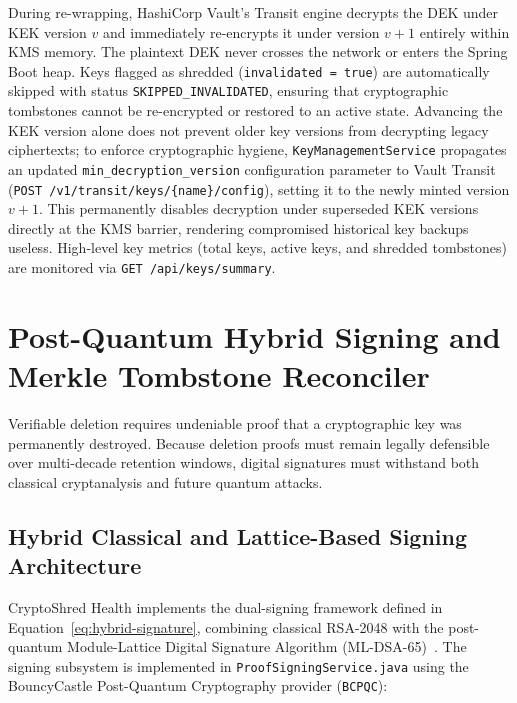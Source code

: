 During re-wrapping, HashiCorp Vault's Transit engine decrypts the DEK under KEK version $v$ and immediately re-encrypts it under version $v+1$ entirely within KMS memory. The plaintext DEK never crosses the network or enters the Spring Boot heap. Keys flagged as shredded (\texttt{invalidated = true}) are automatically skipped with status \texttt{SKIPPED\_INVALIDATED}, ensuring that cryptographic tombstones cannot be re-encrypted or restored to an active state. Advancing the KEK version alone does not prevent older key versions from decrypting legacy ciphertexts; to enforce cryptographic hygiene, \texttt{KeyManagementService} propagates an updated \texttt{min\_decryption\_version} configuration parameter to Vault Transit (\texttt{POST /v1/transit/keys/\{name\}/config}), setting it to the newly minted version $v+1$. This permanently disables decryption under superseded KEK versions directly at the KMS barrier, rendering compromised historical key backups useless. High-level key metrics (total keys, active keys, and shredded tombstones) are monitored via \texttt{GET /api/keys/summary}.


\section{Post-Quantum Hybrid Signing and Merkle Tombstone Reconciler}\label{section:impl-signing}

Verifiable deletion requires undeniable proof that a cryptographic key was permanently destroyed. Because deletion proofs must remain legally defensible over multi-decade retention windows, digital signatures must withstand both classical cryptanalysis and future quantum attacks.

\subsection{Hybrid Classical and Lattice-Based Signing Architecture}

CryptoShred Health implements the dual-signing framework defined in Equation~\ref{eq:hybrid-signature}, combining classical RSA-2048 with the post-quantum Module-Lattice Digital Signature Algorithm (ML-DSA-65)~\cite{nist_fips_204}. The signing subsystem is implemented in \texttt{ProofSigningService.java} using the BouncyCastle Post-Quantum Cryptography provider (\texttt{BCPQC}):

